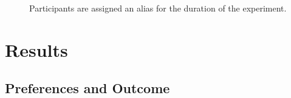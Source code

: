 \begin{figure}
\center
{}
\caption{Participants are assigned an alias for the duration of the experiment.}
\label{fig:alias}
\end{figure}


\section{Results}
\label{sec:res}

\subsection{Preferences and Outcome}
\label{sec:res-outcome}


